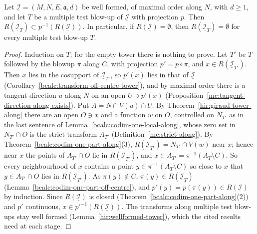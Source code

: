 \begin{theorem}
\label{bcalc:codim-one-part-tower}
\leanok
Let \(\underline{\mathcal I}=(M,N,E,\mathfrak a,d)\) be well formed, of maximal order along \(N\), with \(d\ge1\), and let \(T\) be a multiple test blow-up of
\(\underline{\mathcal I}\) with projection \(p\). Then \(R(\underline{\mathcal I}_T)\subset p^{-1}(R(\underline{\mathcal I}))\). In particular, if \(R(\underline{\mathcal I})=\emptyset\),
then \(R(\underline{\mathcal I}_T)=\emptyset\) for every multiple test blow-up \(T\).
\end{theorem}
\begin{proof}
\leanok
Induction on \(T\); for the empty tower there is nothing to prove. Let \(T'\) be \(T\) followed by the blowup \(\pi\) along \(C\), with projection \(p'=p\circ\pi\),
and \(x\in R(\underline{\mathcal I}_{T'})\). Then \(x\) lies in the cosupport of \(\underline{\mathcal I}_{T'}\), so \(p'(x)\) lies in that of \(\underline{\mathcal I}\)
(Corollary~\ref{bcalc:transform-off-centre-tower}), and by maximal order there is a tangent direction \(u\) along \(N\) on an open \(U\ni p'(x)\)
(Proposition~\ref{mc:tangent-direction-along-exists}). Put \(A=N\cap V(u)\cap U\). By Theorem~\ref{hir:giraud-tower-along} there are an open \(O\ni x\) and a function \(w\)
on \(O\), controlled on \(N_{T'}\) as in the last sentence of Lemma~\ref{bcalc:codim-one-local-along}, whose zero set in \(N_{T'}\cap O\) is the strict transform
\(A_{T'}\) (Definition~\ref{mc:strict-along}). By Theorem~\ref{bcalc:codim-one-part-along}(3), \(R(\underline{\mathcal I}_{T'})=N_{T'}\cap V(w)\) near \(x\); hence near \(x\)
the points of \(A_{T'}\cap O\) lie in \(R(\underline{\mathcal I}_{T'})\), and \(x\in A_{T'}=\overline{\pi^{-1}(A_T\setminus C)}\). So every neighbourhood of \(x\) contains a point
\(y\in\pi^{-1}(A_T\setminus C)\) so close to \(x\) that \(y\in A_{T'}\cap O\) lies in \(R(\underline{\mathcal I}_{T'})\). As \(\pi(y)\notin C\), \(\pi(y)\in R(\underline{\mathcal I}_T)\)
(Lemma~\ref{bcalc:codim-one-part-off-centre}), and \(p'(y)=p(\pi(y))\in R(\underline{\mathcal I})\) by induction. Since \(R(\underline{\mathcal I})\) is closed
(Theorem~\ref{bcalc:codim-one-part-along}(2)) and \(p'\) continuous, \(x\in p'^{-1}(R(\underline{\mathcal I}))\). The transforms along multiple test blow-ups stay well
formed (Lemma~\ref{hir:wellformed-tower}), which the cited results need at each stage.
\end{proof}